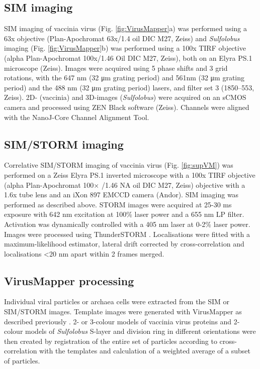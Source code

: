 \subsection{SIM imaging}

SIM imaging of vaccinia virus (Fig. \ref{fig:VirusMapper}a) was performed using a 63x objective (Plan-Apochromat 63x/1.4 oil DIC M27, Zeiss) and \emph{Sulfolobus} imaging (Fig. \ref{fig:VirusMapper}b) was performed using a 100x TIRF objective (alpha Plan-Apochromat 100x/1.46 Oil DIC M27, Zeiss), both on an Elyra PS.1 microscope (Zeiss). Images were acquired using 5 phase shifts and 3 grid rotations, with the 647 nm (32 μm grating period) and 561nm (32 μm grating period) and the 488 nm (32 μm grating period) lasers, and filter set 3 (1850–553, Zeiss). 2D- (vaccinia) and 3D-images (\textit{Sulfolobus}) were acquired on an sCMOS camera and processed using ZEN Black software (Zeiss). Channels were aligned with the NanoJ-Core Channel Alignment Tool.

\subsection{SIM/STORM imaging}

Correlative SIM/STORM imaging of vaccinia virus (Fig. \ref{fig:supVM}) was performed on a Zeiss Elyra PS.1 inverted microscope with a 100x TIRF objective (alpha Plan-Apochromat 100× /1.46 NA oil DIC M27, Zeiss) objective with a 1.6x tube lens and an iXon 897 EMCCD camera (Andor). SIM imaging was performed as described above. STORM images were acquired at 25-30 ms exposure with 642 nm excitation at 100\% laser power and a 655 nm LP filter. Activation was dynamically controlled with a 405 nm laser at 0-2\% laser power. Images were processed using ThunderSTORM \cite{ovesny2014thunderstorm}. Localisations were fitted with a maximum-likelihood estimator, lateral drift corrected by cross-correlation and localisations <20 nm apart within 2 frames merged.
 
\subsection{VirusMapper processing}

Individual viral particles or archaea cells were extracted from the SIM or SIM/STORM images. Template images were generated with VirusMapper as described previously \cite{gray2016virusmapper}. 2- or 3-colour models of vaccinia virus proteins and 2-colour models of \emph{Sulfolobus} S-layer and division ring in different orientations were then created by registration of the entire set of particles according to cross-correlation with the templates and calculation of a weighted average of a subset of particles. 

